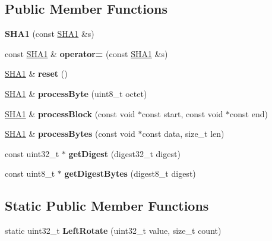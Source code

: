 \subsection*{Public Member Functions}
\begin{DoxyCompactItemize}
\item 
\mbox{\label{classsha1_1_1SHA1_a1d63d04a7f146a42000e0a2a35314c6f}} 
{\bfseries S\+H\+A1} (const \hyperlink{classsha1_1_1SHA1}{S\+H\+A1} \&s)
\item 
\mbox{\label{classsha1_1_1SHA1_ae8f2ccbee9a15968482057e0d03a4247}} 
const \hyperlink{classsha1_1_1SHA1}{S\+H\+A1} \& {\bfseries operator=} (const \hyperlink{classsha1_1_1SHA1}{S\+H\+A1} \&s)
\item 
\mbox{\label{classsha1_1_1SHA1_ae2f5530e5be0837e6a222a1f244cbe6d}} 
\hyperlink{classsha1_1_1SHA1}{S\+H\+A1} \& {\bfseries reset} ()
\item 
\mbox{\label{classsha1_1_1SHA1_a8f7edf8ccfea07f988d5f40c4b5c768b}} 
\hyperlink{classsha1_1_1SHA1}{S\+H\+A1} \& {\bfseries process\+Byte} (uint8\+\_\+t octet)
\item 
\mbox{\label{classsha1_1_1SHA1_af5e58568ad3bcaf91640c7fd5e448d85}} 
\hyperlink{classsha1_1_1SHA1}{S\+H\+A1} \& {\bfseries process\+Block} (const void $\ast$const start, const void $\ast$const end)
\item 
\mbox{\label{classsha1_1_1SHA1_abf8a680503b98b8f773f98752e34dbca}} 
\hyperlink{classsha1_1_1SHA1}{S\+H\+A1} \& {\bfseries process\+Bytes} (const void $\ast$const data, size\+\_\+t len)
\item 
\mbox{\label{classsha1_1_1SHA1_a7a097712264451da60aa0f30096dd516}} 
const uint32\+\_\+t $\ast$ {\bfseries get\+Digest} (digest32\+\_\+t digest)
\item 
\mbox{\label{classsha1_1_1SHA1_a4fd38b624cba611b65730a9e747c584e}} 
const uint8\+\_\+t $\ast$ {\bfseries get\+Digest\+Bytes} (digest8\+\_\+t digest)
\end{DoxyCompactItemize}
\subsection*{Static Public Member Functions}
\begin{DoxyCompactItemize}
\item 
\mbox{\label{classsha1_1_1SHA1_a88fa19fad6a3b06522b2826a5966f355}} 
static uint32\+\_\+t {\bfseries Left\+Rotate} (uint32\+\_\+t value, size\+\_\+t count)
\end{DoxyCompactItemize}
